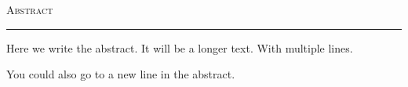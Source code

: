 \thispagestyle{plain}
\vspace*{3cm}
\begin{center}
    \textsc{\LARGE Abstract}

    \rule{5cm}{0.4pt}

    \vspace{1cm}

    Here we write the abstract.
    It will be a longer text. With multiple lines.

    You could also go to a new line in the abstract.
\end{center}
\newpage
